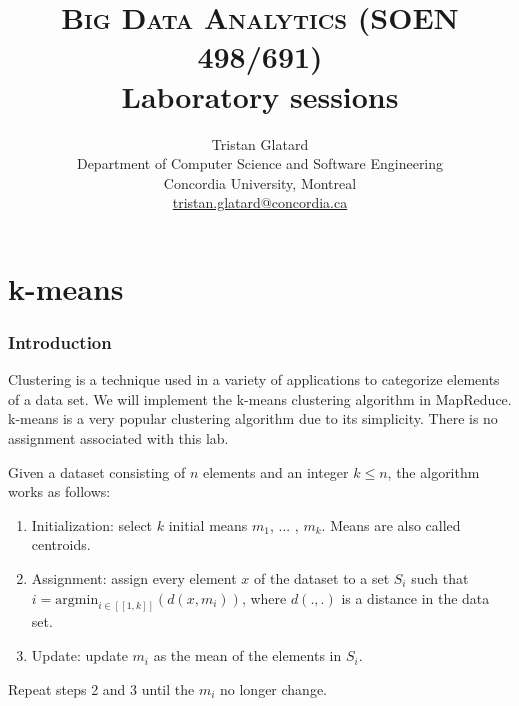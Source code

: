 \documentclass[11pt]{article}
\title{\textsc{Big Data Analytics (SOEN 498/691)} \\ Laboratory sessions}
\author{Tristan Glatard\\Department of Computer Science and Software Engineering\\Concordia University, Montreal\\\href{mailto:tristan.glatard@concordia.ca}{tristan.glatard@concordia.ca}}
\begin{document}
\maketitle

\newpage

\tableofcontents

\newpage

\part{k-means}

\section{Introduction}

Clustering is a technique used in a variety of applications to
categorize elements of a data set. We will implement the k-means
clustering algorithm in MapReduce. k-means is a very popular
clustering algorithm due to its simplicity. There is no assignment
associated with this lab.

Given a dataset consisting of $n$ elements and an integer $k\leq n$, the algorithm works as follows:
\begin{enumerate}
\item Initialization: select $k$ initial means $m_1$, ... , $m_k$. Means are also called centroids.
\item Assignment: assign every element $x$ of the dataset to a set
  $S_i$ such that $i=\mathrm{argmin}_{i \in [\![1,k]\!]}(d(x,m_i))$,
  where $d(.,.)$ is a distance in the data set.
\item Update: update $m_i$ as the mean of the elements in $S_i$.
\end{enumerate}
Repeat steps 2 and 3 until the $m_i$ no longer change.
\end{document}
